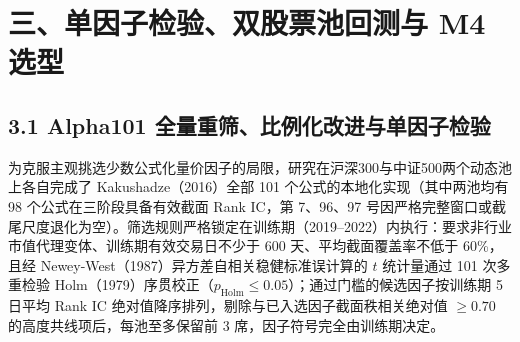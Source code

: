 \documentclass[12pt,a4paper]{article}
\let\origsection\section
\renewcommand{\section}[1]{\needspace{6.5\baselineskip}\origsection{#1}}
\let\origsubsection\subsection
\renewcommand{\subsection}[1]{\needspace{4\baselineskip}\origsubsection{#1}}
\begin{document}
\vspace{4pt}

\section{三、单因子检验、双股票池回测与 M4 选型}

\subsection{3.1 Alpha101 全量重筛、比例化改进与单因子检验}

为克服主观挑选少数公式化量价因子的局限，研究在沪深300与中证500两个动态池上各自完成了 Kakushadze（2016）全部 101 个公式的本地化实现（其中两池均有 98 个公式在三阶段具备有效截面 Rank IC，第 7、96、97 号因严格完整窗口或截尾尺度退化为空）。筛选规则严格锁定在训练期（2019–2022）内执行：要求非行业市值代理变体、训练期有效交易日不少于 600 天、平均截面覆盖率不低于 60\%，且经 Newey-West（1987）异方差自相关稳健标准误计算的 $t$ 统计量通过 101 次多重检验 Holm（1979）序贯校正（$p_{\text{Holm}} \le 0.05$）；通过门槛的候选因子按训练期 5 日平均 Rank IC 绝对值降序排列，剔除与已入选因子截面秩相关绝对值 $\ge 0.70$ 的高度共线项后，每池至多保留前 3 席，因子符号完全由训练期决定。
\end{document}
